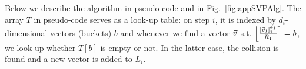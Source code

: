 Below we describe the algorithm in pseudo-code and in Fig.~\ref{fig:appSVPAlg}. The array $T$ in pseudo-code serves as a look-up table: on step $i$, it is indexed by $d_i$-dimensional vectors (buckets) $b$ and whenever we find a vector $\vvec$ s.t. $\Big\lfloor \frac{[\vvec_1]_1^{d_1}}{R_1} \Big\rceil = b$, we look up whether $T[b]$ is empty or not. In the latter case, the collision is found and a new vector is added to $L_{i}$. 